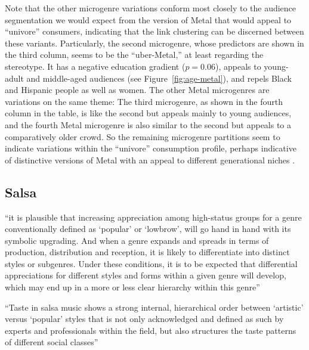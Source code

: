 \documentclass[a4paper,12pt]{extarticle}
\begin{document}
Note that the other microgenre variations conform most closely to the audience segmentation we would expect from the version of Metal that would appeal to ``univore'' consumers, indicating that the link clustering can be discerned between these variants. Particularly, the second microgenre, whose predictors are shown in the third column, seems to be the ``uber-Metal,'' at least regarding the stereotype. It has a negative education gradient ($p = 0.06$), appeals to young-adult and middle-aged audiences (see Figure~\ref{fig:age-metal}), and repels Black and Hispanic people as well as women. The other Metal microgenres are variations on the same theme: The third microgenre, as shown in the fourth column in the table, is like the second but appeals mainly to young audiences, and the fourth Metal microgenre is also similar to the second but appeals to a comparatively older crowd. So the remaining microgenre partitions seem to indicate variations within the ``univore'' consumption profile, perhaps indicative of distinctive versions of Metal with an appeal to different generational niches \citep{koch2020evolutionary}. 

\subsection{Salsa}
``it is plausible that increasing appreciation among high-status groups for a genre conventionally defined as ‘popular’ or ‘lowbrow’, will go hand in hand with its symbolic upgrading. And when a genre expands and spreads in terms of production, distribution and reception, it is likely to differentiate into distinct styles or subgenres. Under these conditions, it is to be expected that differential appreciations for different styles and forms within a given genre will develop, which may end up in a more or less clear hierarchy within this genre'' \citeyearpar[][62]{Bachmayer2014-pk}

``Taste in salsa music shows a strong internal, hierarchical order between ‘artistic’ versus ‘popular’ styles that is not only acknowledged and defined as such by experts and professionals within the field, but also structures the taste patterns of different social classes'' \citeyearpar[][62]{Bachmayer2014-pk}
\end{document}
